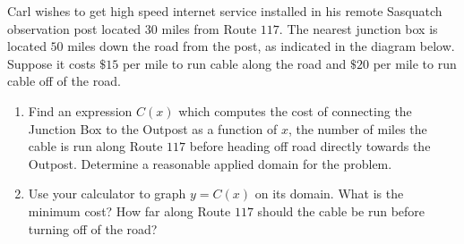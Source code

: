 \documentclass{ximera}
\begin{document}
\begin{example} \label{SasquatchCable} Carl wishes to get high speed internet service installed in his remote Sasquatch observation post located $30$ miles from Route $117$. The nearest junction box is located $50$ miles down the road from the post, as indicated in the diagram below.  Suppose it costs $\$ 15$ per mile to run cable along the road and $\$ 20$ per mile to run cable off of the road.

\begin{enumerate}

\item   Find an expression $C(x)$ which computes the cost of connecting the Junction Box to the Outpost as a function of $x$, the number of miles the cable is run along Route $117$ before heading off road directly towards the Outpost.  Determine a reasonable applied domain for the problem.

\item  Use your calculator to graph $y=C(x)$ on its domain.  What is the minimum cost?  How far along Route $117$ should the cable be run before turning off of the road?

\end{enumerate}

\begin{center}
% 

\end{center}




\end{example}
\end{document}
